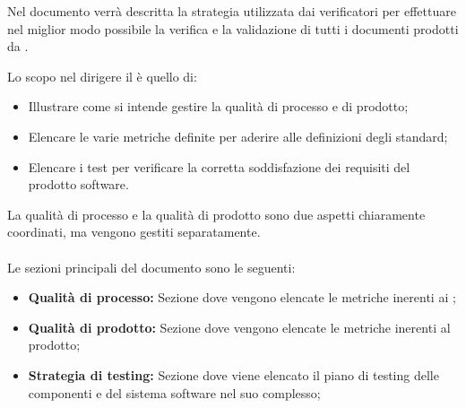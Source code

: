 Nel documento \PdQ{} verrà descritta la strategia utilizzata dai verificatori per effettuare nel miglior modo possibile la verifica e la validazione di tutti i documenti prodotti da \Gruppo{}.

Lo scopo nel dirigere il \PdQ{} è quello di:
\begin{itemize}
	\item Illustrare come si intende gestire la qualità di processo e di prodotto;
	\item Elencare le varie metriche definite per aderire alle definizioni degli standard;
	\item Elencare i test per verificare la corretta soddisfazione dei requisiti del prodotto software.
\end{itemize}

La qualità di processo e la qualità di prodotto sono due aspetti chiaramente coordinati, ma vengono gestiti separatamente. \\ \\
Le sezioni principali del documento sono le seguenti:
\begin{itemize}
    \item \textbf{Qualità di processo:} Sezione dove vengono elencate le metriche inerenti ai ;
    \item \textbf{Qualità di prodotto:} Sezione dove vengono elencate le metriche inerenti al prodotto;
    \item \textbf{Strategia di testing:} Sezione dove viene elencato il piano di testing delle componenti e del sistema software nel suo complesso;
\end{itemize}
